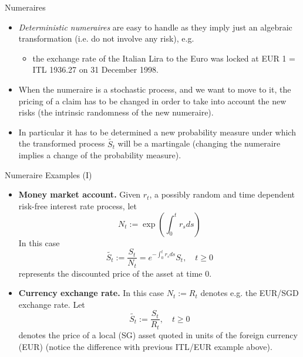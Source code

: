 \documentclass{beamer}
\begin{document}
\begin{frame}{Numeraires}
	\begin{itemize}
		\item \emph{Deterministic numeraires} are easy to handle as they imply just an algebraic transformation (i.e. do not involve any risk), e.g.
		\begin{itemize}
			\item the exchange rate of the Italian Lira to the Euro was locked at EUR 1 = ITL 1936.27 on 31 December 1998.
		\end{itemize}
		\item When the numeraire is a stochastic process, and we want to move to it, the pricing of a claim has to be changed in order to take into account the new risks (the intrinsic randomness of the new numeraire).
		\item In particular it has to be determined a new probability measure under which the transformed process $\tilde{S_t}$ will be a martingale (changing the numeraire implies a change of the probability measure).
	\end{itemize}
\end{frame}

\begin{frame}{Numeraire Examples (I)}
	\begin{itemize}
		\item \textbf{Money market account.} Given $r_t$, a possibly random and time dependent risk-free interest rate process, let
		\begin{equation*}
			N_t := \exp\left(\int_0^t r_s ds\right)
		\end{equation*}
		In this case 
		\begin{equation*}
			\tilde{S_t}:=\frac{S_t}{N_t}=e^{-\int_0^t r_s ds}S_t, \quad t \ge 0
		\end{equation*}
		represents the discounted price of the asset at time 0.
		\item \textbf{Currency exchange rate.} In this case $N_t := R_t$ denotes e.g. the EUR/SGD exchange rate. Let
		\begin{equation*}
			\tilde{S_t}:=\frac{S_t}{R_t}, \quad t \ge 0
		\end{equation*}
		denotes the price of a local (SG) asset quoted in units of the foreign currency (EUR) (notice the difference with previous ITL/EUR example above).
	\end{itemize}
\end{frame}
\end{document}
